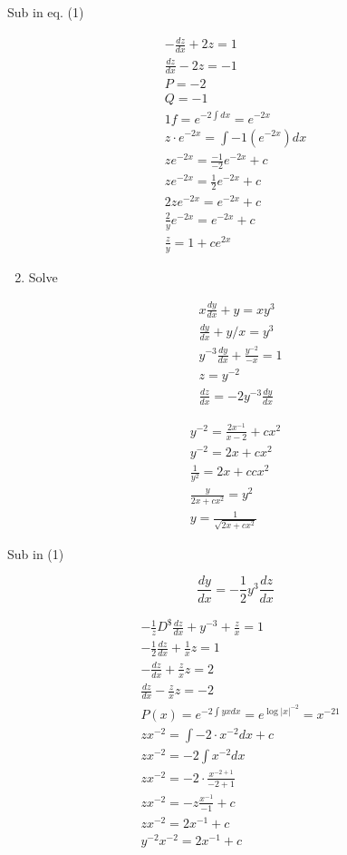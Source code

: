 \documentclass[10pt]{article}
\begin{document}
Sub in eq. (1)

$$
\begin{gathered}
-\frac{d z}{d x}+2 z=1 \\
\frac{d z}{d x}-2 z=-1 \\
P=-2 \\
Q=-1 \\
1 f=e^{-2 \int d x}=e^{-2 x} \\
z \cdot e^{-2 x}=\int-1\left(e^{-2 x}\right) d x \\
z e^{-2 x}=\frac{-1}{-2} e^{-2 x}+c \\
z e^{-2 x}=\frac{1}{2} e^{-2 x}+c \\
2 z e^{-2 x}=e^{-2 x}+c \\
\frac{2}{y} e^{-2 x}=e^{-2 x}+c \\
\frac{z}{y}=1+c e^{2 x}
\end{gathered}
$$

\begin{enumerate}
  \setcounter{enumi}{1}
  \item Solve
\end{enumerate}


\begin{align*}
& x \frac{d y}{d x}+y=x y^{3} \\
& \frac{d y}{d x}+y / x=y^{3} \\
& y^{-3} \frac{d y}{d x}+\frac{y^{-2}}{-x}=1  \tag{1}\\
& z=y^{-2} \\
& \frac{d z}{d x}=-2 y^{-3} \frac{d y}{d x}
\end{align*}


$$
\begin{gathered}
y^{-2}=\frac{2 x^{-1}}{x-2}+c x^{2} \\
y^{-2}=2 x+c x^{2} \\
\frac{1}{y^{2}}=2 x+c c x^{2} \\
\frac{y}{2 x+c x^{2}}=y^{2} \\
y=\frac{1}{\sqrt{2 x+c x^{2}}}
\end{gathered}
$$

Sub in (1)

$$
\frac{d y}{d x}=-\frac{1}{2} y^{3} \frac{d z}{d x}
$$

$$
\begin{aligned}
& -\frac{1}{z} D^{\$} \frac{d z}{d x}+y^{-3}+\frac{z}{x}=1 \\
& -\frac{1}{2} \frac{d z}{d x}+\frac{1}{x} z=1 \\
& -\frac{d z}{d x}+\frac{z}{x} z=2 \\
& \frac{d z}{d x}-\frac{z}{x} z=-2 \\
& P(x)=e^{-2 \int y x d x}=e^{\log |x|^{-2}}=x^{-21} \\
& z x^{-2}=\int-2 \cdot x^{-2} d x+c \\
& z x^{-2}=-2 \int x^{-2} d x \\
& z x^{-2}=-2 \cdot \frac{x^{-2+1}}{-2+1} \\
& z x^{-2}=-z \frac{x^{-1}}{-1}+c \\
& z x^{-2}=2 x^{-1}+c \\
& y^{-2} x^{-2}=2 x^{-1}+c
\end{aligned}
$$
\end{document}
